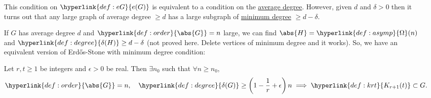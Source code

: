 \documentclass{article}
\newenvironment{manualtheorem}[1]{%
    \renewcommand\themanualtheoreminner{#1}%
    \manualtheoreminner
}{\endmanualtheoreminner}
\begin{document}
This condition on $\hyperlink{def:eG}{e(G)}$ is equivalent to a condition on the \hyperlink{def:degree}{average degree}.
However, given $d$ and $\delta > 0$ then it turns out that any large graph of average degree $\geq d$ has a large subgraph of \hyperlink{def:degree}{minimum degree} $\geq d - \delta$.

If $G$ has average degree $d$ and $\hyperlink{def:order}{\abs{G}} = n$ large, we can find $\abs{H} = \hyperlink{def:asymp}{\Omega}(n)$ and $\hyperlink{def:degree}{\delta(H)} \geq d - \delta$ (not proved here. Delete vertices of minimum degree and it works).
So, we have an equivalent version of Erd\H{o}s-Stone with minimum degree condition:

\begin{manualtheorem}{14a}\label{thm:14a}
    Let $r, t \geq 1$ be integers and $\epsilon > 0$ be real. Then $\exists n_0$ such that $\forall n \geq n_0$,
    \begin{equation*}
        \hyperlink{def:order}{\abs{G}} = n, \quad \hyperlink{def:degree}{\delta(G)} \geq \left(1 - \frac{1}{r} + \epsilon\right) n \implies \hyperlink{def:krt}{K_{r+1}(t)} \subset G.
    \end{equation*}
\end{manualtheorem}
\end{document}
